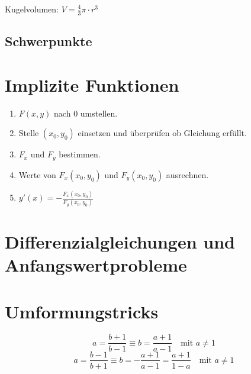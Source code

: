 \documentclass[main.tex]{subfiles}
\begin{document}
Kugelvolumen: $V = \frac{4}{3} \pi\cdot r^3$

\subsection{Schwerpunkte}

\section{Implizite Funktionen}
\begin{enumerate}
    \item $F(x, y)$ nach $0$ umstellen.
    \item Stelle $(x_0, y_0)$ einsetzen und überprüfen ob Gleichung erfüllt.
    \item $F_x$ und $F_y$ bestimmen.
    \item Werte von $F_x(x_0, y_0)$ und $F_y(x_0, y_0)$ ausrechnen.
    \item $y'(x) = - \frac{F_x(x_0, y_0)}{F_y(x_0, y_0)}$
\end{enumerate}


\section{Differenzialgleichungen und Anfangswertprobleme}



\section{Umformungstricks}
\[
	a = \frac{b+1}{b-1} \equiv
	b = \frac{a+1}{a-1}\quad \text{mit } a \neq 1
\]
\[
	a = \frac{b-1}{b+1} \equiv
	b = -\frac{a+1}{a-1} = \frac{a+1}{1-a} \quad \text{mit } a \neq 1
\]
\end{document}
